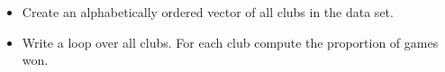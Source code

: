 \documentclass[]{article}
\newenvironment{Shaded}{\begin{snugshade}}{\end{snugshade}}
\newcommand{\KeywordTok}[1]{\textcolor[rgb]{0.13,0.29,0.53}{\textbf{#1}}}
\newcommand{\StringTok}[1]{\textcolor[rgb]{0.31,0.60,0.02}{#1}}
\newcommand{\OperatorTok}[1]{\textcolor[rgb]{0.81,0.36,0.00}{\textbf{#1}}}
\newcommand{\NormalTok}[1]{#1}
\providecommand{\tightlist}{%
  \setlength{\itemsep}{0pt}\setlength{\parskip}{0pt}}
\begin{document}
\begin{itemize}
\tightlist
\item
  Create an alphabetically ordered vector of all clubs in the data set.
\end{itemize}

\begin{Shaded}
\end{Shaded}

\begin{itemize}
\tightlist
\item
  Write a loop over all clubs. For each club compute the proportion of
  games won.
\end{itemize}
\end{document}
